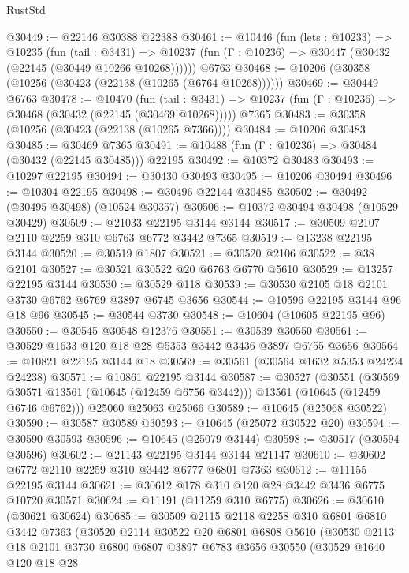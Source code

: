 \begin{lexlean}{RustStd}
\begin{coremodule}
@30449 := @22146 @30388 @22388
@30461 := @10446
    (fun (lets : @10233) =>
    @10235
      (fun (tail : @3431) =>
      @10237 (fun (Γ : @10236) => @30447 (@30432 (@22145 (@30449 @10266 @10268))))))
    @6763
@30468 := @10206 (@30358 (@10256 (@30423 (@22138 (@10265 (@6764 @10268))))))
@30469 := @30449 @6763
@30478 := @10470
    (fun (tail : @3431) => @10237 (fun (Γ : @10236) => @30468 (@30432 (@22145 (@30469 @10268)))))
    @7365
@30483 := @30358 (@10256 (@30423 (@22138 (@10265 @7366))))
@30484 := @10206 @30483
@30485 := @30469 @7365
@30491 := @10488 (fun (Γ : @10236) => @30484 (@30432 (@22145 @30485))) @22195
@30492 := @10372 @30483
@30493 := @10297 @22195
@30494 := @30430 @30493
@30495 := @10206 @30494
@30496 := @10304 @22195
@30498 := @30496 @22144 @30485
@30502 := @30492 (@30495 @30498) (@10524 @30357)
@30506 := @10372 @30494 @30498 (@10529 @30429)
@30509 := @21033 @22195 @3144 @3144
@30517 := @30509 @2107 @2110 @2259 @310 @6763 @6772 @3442 @7365
@30519 := @13238 @22195 @3144
@30520 := @30519 @1807
@30521 := @30520 @2106
@30522 := @38 @2101
@30527 := @30521 @30522 @20 @6763 @6770 @5610
@30529 := @13257 @22195 @3144
@30530 := @30529 @118
@30539 := @30530 @2105 @18 @2101 @3730 @6762 @6769 @3897 @6745 @3656
@30544 := @10596 @22195 @3144 @96 @18 @96
@30545 := @30544 @3730
@30548 := @10604 (@10605 @22195 @96)
@30550 := @30545 @30548 @12376
@30551 := @30539 @30550
@30561 := @30529 @1633 @120 @18 @28 @5353 @3442 @3436 @3897 @6755 @3656
@30564 := @10821 @22195 @3144 @18
@30569 := @30561 (@30564 @1632 @5353 @24234 @24238)
@30571 := @10861 @22195 @3144
@30587 := @30527
    (@30551
      (@30569 @30571 @13561 (@10645 (@12459 @6756 @3442)))
      @13561
      (@10645 (@12459 @6746 @6762)))
    @25060
    @25063
    @25066
@30589 := @10645 (@25068 @30522)
@30590 := @30587 @30589
@30593 := @10645 (@25072 @30522 @20)
@30594 := @30590 @30593
@30596 := @10645 (@25079 @3144)
@30598 := @30517 (@30594 @30596)
@30602 := @21143 @22195 @3144 @3144 @21147
@30610 := @30602 @6772 @2110 @2259 @310 @3442 @6777 @6801 @7363
@30612 := @11155 @22195 @3144
@30621 := @30612 @178 @310 @120 @28 @3442 @3436 @6775 @10720 @30571
@30624 := @11191 (@11259 @310 @6775)
@30626 := @30610 (@30621 @30624)
@30685 := @30509
    @2115
    @2118
    @2258
    @310
    @6801
    @6810
    @3442
    @7363
    (@30520
      @2114
      @30522
      @20
      @6801
      @6808
      @5610
      (@30530
        @2113
        @18
        @2101
        @3730
        @6800
        @6807
        @3897
        @6783
        @3656
        @30550
        (@30529
          @1640
          @120
          @18
          @28

\end{coremodule}
\end{lexlean}
